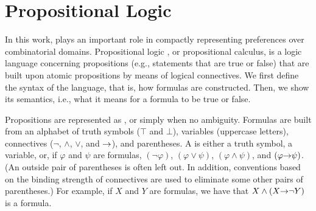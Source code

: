 \section{Propositional Logic}
In this work,  plays an important role in compactly representing
preferences over combinatorial domains.
Propositional logic \cite{heindiscrete}, or propositional calculus, is a logic language concerning
propositions (e.g., statements that are true or false) that are built upon atomic propositions
by means of logical connectives.
We first define the syntax of the language, that is, how formulas are constructed.
Then, we show its semantics, i.e., what it means for a formula to be true or false.

Propositions are represented as , or simply  when no ambiguity.
Formulas are built from an alphabet of truth symbols ($\top$ and $\bot$),
variables (uppercase letters), connectives ($\neg$, $\land$, $\lor$, and $\mathit{\rightarrow}$), and parentheses.
A  is either a truth symbol, a variable, or, if $\varphi$ and $\psi$ are formulas,
$(\neg \varphi)$, $(\varphi \lor \psi)$, $(\varphi \land \psi)$, and
$(\varphi \mathit{\rightarrow} \psi)$. (An outside pair of parentheses is often left out.
In addition, conventions based on the binding strength of connectives
are used to eliminate some other pairs of parentheses.)
For example, if $X$ and $Y$ are formulas, we have that $X \land (X \mathit{\rightarrow} \neg Y)$ is a formula.

%


